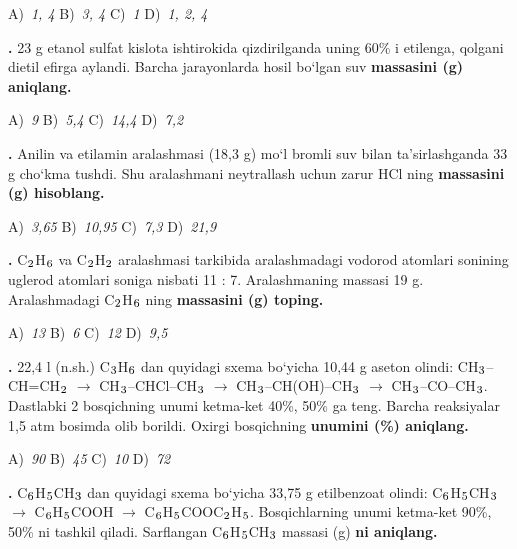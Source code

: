 \documentclass[11pt,a4paper]{article}
\renewcommand{\textsubscript}[1]{\ensuremath{_{\text{\fontsize{8}{8}\selectfont #1}}}}
\newcommand{\qn}[1]{\textbf{\fontsize{11.5}{13}\selectfont #1}}
\newcommand{\qsep}{\par\vspace{13pt}}
\begin{document}
\begin{multicols}{2}
\noindent A)~\textsl{1, 4} \hfill B)~\textsl{3, 4} \hfill C)~\textsl{1} \hfill D)~\textsl{1, 2, 4}\par
\qsep
\noindent\qn{23.} 23 g etanol sulfat kislota ishtirokida qizdirilganda uning 60\% i etilenga, qolgani dietil efirga aylandi. Barcha jarayonlarda hosil bo`lgan suv \textbf{massasini (g) aniqlang.}

\noindent A)~\textsl{9} \hfill B)~\textsl{5,4} \hfill C)~\textsl{14,4} \hfill D)~\textsl{7,2}\par
\qsep
\noindent\qn{24.} Anilin va etilamin aralashmasi (18,3 g) mo`l bromli suv bilan ta'sirlashganda 33 g cho`kma tushdi. Shu aralashmani neytrallash uchun zarur HCl ning \textbf{massasini (g) hisoblang.}

\noindent A)~\textsl{3,65} \hfill B)~\textsl{10,95} \hfill C)~\textsl{7,3} \hfill D)~\textsl{21,9}\par
\qsep
\noindent\qn{25.} C\textsubscript{2}H\textsubscript{6} va C\textsubscript{2}H\textsubscript{2} aralashmasi tarkibida aralashmadagi vodorod atomlari sonining uglerod atomlari soniga nisbati 11 : 7. Aralashmaning massasi 19 g. Aralashmadagi C\textsubscript{2}H\textsubscript{6} ning \textbf{massasini (g) toping.}

\noindent A)~\textsl{13} \hfill B)~\textsl{6} \hfill C)~\textsl{12} \hfill D)~\textsl{9,5}\par
\qsep
\noindent\qn{26.} 22,4 l (n.sh.) C\textsubscript{3}H\textsubscript{6} dan quyidagi sxema bo`yicha 10,44 g aseton olindi: CH\textsubscript{3}--CH=CH\textsubscript{2} $\to$ CH\textsubscript{3}--CHCl--CH\textsubscript{3} $\to$ CH\textsubscript{3}--CH(OH)--CH\textsubscript{3} $\to$ CH\textsubscript{3}--CO--CH\textsubscript{3}. Dastlabki 2 bosqichning unumi ketma-ket 40\%, 50\% ga teng. Barcha reaksiyalar 1,5 atm bosimda olib borildi. Oxirgi bosqichning \textbf{unumini (\%) aniqlang.}

\noindent A)~\textsl{90} \hfill B)~\textsl{45} \hfill C)~\textsl{10} \hfill D)~\textsl{72}\par
\qsep
\noindent\qn{27.} C\textsubscript{6}H\textsubscript{5}CH\textsubscript{3} dan quyidagi sxema bo`yicha 33,75 g etilbenzoat olindi: C\textsubscript{6}H\textsubscript{5}CH\textsubscript{3} $\to$ C\textsubscript{6}H\textsubscript{5}COOH $\to$ C\textsubscript{6}H\textsubscript{5}COOC\textsubscript{2}H\textsubscript{5}. Bosqichlarning unumi ketma-ket 90\%, 50\% ni tashkil qiladi. Sarflangan C\textsubscript{6}H\textsubscript{5}CH\textsubscript{3} massasi (g) \textbf{ni aniqlang.}


\end{multicols}
\end{document}
